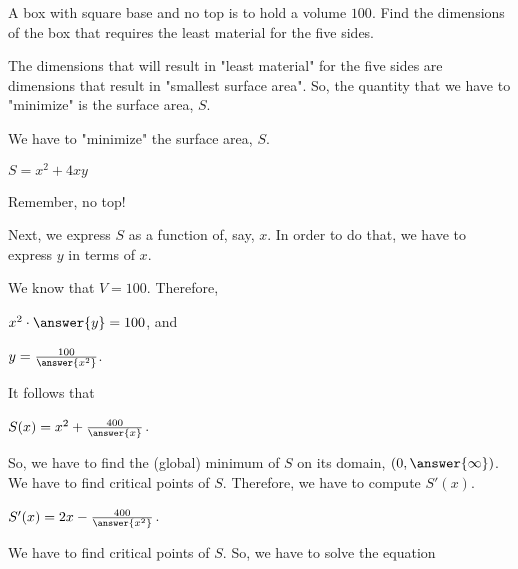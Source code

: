 \documentclass{ximera}
\author{Bart Snapp\and Nela Lakos}
\begin{document}
\begin{exercise}

  
  A box with square base and no top is to hold a volume $100$.  Find
  the dimensions of the box that requires the least material for the
  five sides.
  \begin{hint}
  \end{hint}
  \begin{hint}
  The dimensions that will result in  "least material" for the five sides are dimensions that result in "smallest surface area".
  So, the quantity that we have to "minimize" is the surface area, $S$.
  \end{hint}
  \begin{hint}
  We have to "minimize"  the surface area, $S$.
  
  $S=x^2 +4xy$
  
  Remember, no top!
  \end{hint}
    \begin{hint}
Next, we express $S$ as a function of, say, $x$.
In order to do that, we have to express $y$ in terms of $x$.


We know that  $V=100$. Therefore,

$x^2\cdot \answer{ y}=100$,
and 

$y=\frac{100}{\answer{x^2}}$.
  
 It follows that 
  
   $S(x)=x^2 +\frac{400}{\answer{x}}$.

  \end{hint}
  \begin{hint}
  So, we have to find the (global) minimum of $S$ on its domain, $(0,\answer{\infty})$.
  We have to find critical points of $S$.
  Therefore, we have to compute $S'(x)$.
  \end{hint}
  \begin{hint}
  $S'(x)=2x-\frac{400}{\answer{x^2}}$.
    \end{hint}
     \begin{hint}
     We have to find critical points of $S$.
     So, we have to solve the equation
     

\end{hint}
\end{exercise}
\end{document}
